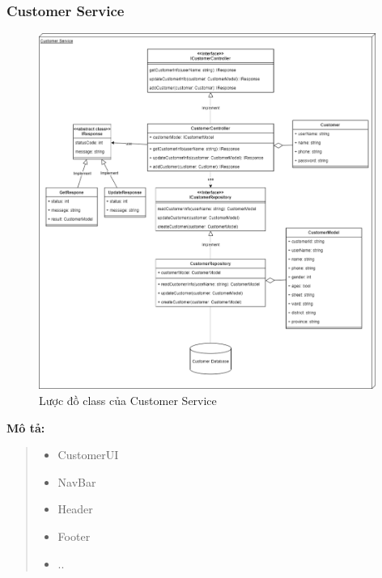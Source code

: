 \subsubsection{Customer Service}
\begin{figure}[!htp]
	\centering
	\includegraphics[width=11cm]{img/Architecture/service/CustomerService.png}
	\newline
	\caption{Lược đồ class của Customer Service}
\end{figure}
\textbf{Mô tả:}
\begin{quote}
	\begin{itemize}
		\item CustomerUI
		\item NavBar
		\item Header
		\item Footer
		\item ..
	\end{itemize}
\end{quote}


